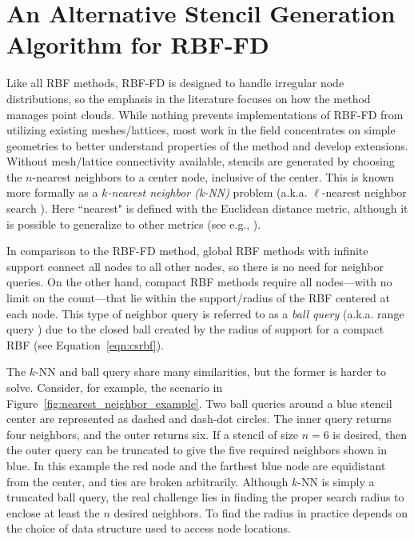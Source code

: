 \documentclass{report}
\begin{document}
\fi




\chapter{An Alternative Stencil Generation Algorithm for RBF-FD}
\label{chap:stencils}

Like all RBF methods, RBF-FD is designed to handle irregular node distributions, so the emphasis in the literature focuses on how the method manages point clouds. While nothing prevents implementations of RBF-FD from utilizing existing meshes/lattices, most work in the field concentrates on simple geometries to better understand properties of the method and develop extensions. Without mesh/lattice connectivity available, stencils are generated by choosing the $n$-nearest neighbors to a center node, inclusive of the center. This is known more formally as a \emph{$k$-nearest neighbor (k-NN)} problem \cite{TagliasacchiMFE} (a.k.a. $\ell$-nearest neighbor search \cite{WendlandBook}). Here ``nearest" is defined with the Euclidean distance metric, although it is possible to generalize to other metrics (see e.g., \cite{MatlabKDTreeSearcher}). 

In comparison to the RBF-FD method, global RBF methods with infinite support connect all nodes to all other nodes, so there is no need for neighbor queries. On the other hand, compact RBF methods require all nodes---with no limit on the count---that lie within the support/radius of the RBF centered at each node. This type of neighbor query is referred to as a \emph{ball query} (a.k.a. range query \cite{WendlandBook}) due to the closed ball created by the radius of support for a compact RBF (see Equation~\ref{eqn:csrbf}). 

The $k$-NN and ball query share many similarities, but the former is harder to solve. Consider, for example, the scenario in Figure~\ref{fig:nearest_neighbor_example}. Two ball queries around a blue stencil center are represented as dashed and dash-dot circles. The inner query returns four neighbors, and the outer returns six. If a stencil of size $n=6$ is desired, then the outer query can be truncated to give the five required neighbors shown in blue. In this example the red node and the farthest blue node are equidistant from the center, and ties are broken arbitrarily. Although $k$-NN is simply a truncated ball query, the real challenge lies in finding the proper search radius to enclose at least the $n$ desired neighbors. To find the radius in practice depends on the choice of data structure used to access node locations. 
\end{document}
